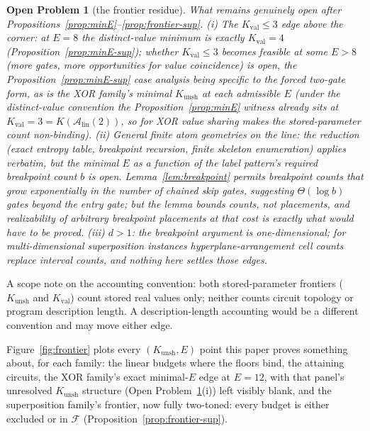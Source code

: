 \documentclass[twocolumn,10pt]{article}
\newtheorem{openproblem}[theorem]{Open Problem}
\theoremstyle{definition}
\theoremstyle{remark}
\newcommand{\cA}{\mathcal{A}}
\newcommand{\cF}{\mathcal{F}}
\newcommand{\Alin}{\cA_{\mathrm{lin}}}
\newcommand{\Kunsh}{K_{\mathrm{unsh}}}
\newcommand{\Kval}{K_{\mathrm{val}}}
\begin{document}
\begin{openproblem}[the frontier residue]
\label{op:frontier}
What remains genuinely open after
Propositions~\ref{prop:minE}--\ref{prop:frontier-sup}. \emph{(i) The
$\Kval \le 3$ edge above the corner:} at $E = 8$ the distinct-value
minimum is exactly $\Kval = 4$ (Proposition~\ref{prop:minE-sup});
whether $\Kval \le 3$ becomes feasible at some $E > 8$ (more
gates, more opportunities for value coincidence) is open, the
Proposition~\ref{prop:minE-sup} case analysis being specific to the
forced two-gate form, as is the XOR family's minimal $\Kunsh$ at each
admissible $E$ (under the distinct-value convention the
Proposition~\ref{prop:minE} witness already sits at
$\Kval = 3 = K(\Alin(2))$, so for XOR value sharing makes the
stored-parameter count non-binding).
\emph{(ii) General finite atom geometries on the line:} the reduction
(exact entropy table, breakpoint recursion, finite skeleton
enumeration) applies verbatim, but the minimal $E$ as a function of
the label pattern's required breakpoint count $b$ is open.
Lemma~\ref{lem:breakpoint} permits breakpoint counts that grow
exponentially in the number of chained skip gates, suggesting
$\Theta(\log b)$ gates beyond the entry gate; but the lemma bounds
counts, not placements, and realizability of arbitrary breakpoint
\emph{placements} at that cost is exactly what would have to be proved.
\emph{(iii) $d > 1$:} the breakpoint argument is one-dimensional; for
multi-dimensional superposition instances hyperplane-arrangement cell
counts replace interval counts, and nothing here settles those edges.
\end{openproblem}

A scope note on the accounting convention: both stored-parameter
frontiers ($\Kunsh$ and $\Kval$) count stored real values only; neither
counts circuit topology or program
description length. A description-length accounting would be a
different convention and may move either edge.

Figure~\ref{fig:frontier} plots every $(\Kunsh, E)$ point this paper
proves
something about, for each family: the linear budgets where the floors
bind, the attaining circuits, the XOR family's exact minimal-$E$ edge
at $E = 12$, with that panel's unresolved $\Kunsh$ structure
(Open Problem~\ref{op:frontier}(i)) left visibly blank, and the
superposition family's frontier, now fully two-toned: every budget is
either excluded or in $\cF$ (Proposition~\ref{prop:frontier-sup}).
\end{document}
